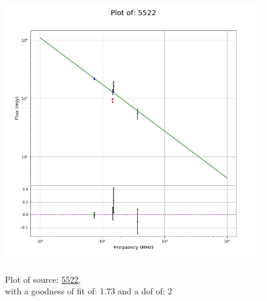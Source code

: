 \documentclass{article}
\begin{document}
\begin{figure}[H]
    \centering
    \begin{minipage}{.5\textwidth}
        \centering
        \includegraphics[scale = 0.35]{KmeulenSimSource_1hr/1hr5522.png}
        \captionsetup{labelformat=empty}
        \caption{Plot of source: \href{http://banana.transientskp.org/r4/vlo_KmeulenSimSource/runningcatalog/5522}{5522},\\with a goodness of fit of: 1.73 and a dof of: 2}
        \addtocounter{figure}{-1}
        \label{KmeulenSimSource:1hr:5522:plot}
    \end{minipage}%
    \begin{minipage}{0.5\textwidth}
        \centering


\end{minipage}
\end{figure}
\end{document}
